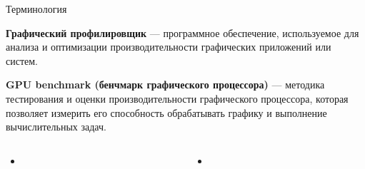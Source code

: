 \documentclass{beamer}
\begin{document}
\begin{frame}{Терминология}
{	\textbf{Графический профилировщик} --- программное обеспечение, используемое для анализа и оптимизации производительности графических приложений или систем. 
	
	\textbf{GPU benchmark (бенчмарк графического процессора)} --- методика тестирования и оценки производительности графического процессора, которая позволяет измерить его способность обрабатывать графику и выполнение вычислительных задач. 
}
\end{frame}

\begin{columns}
	
	\begin{column}{0.5\textwidth}
		\begin{itemize}
			\item
			
		\end{itemize}
	\end{column}
	\begin{column}{0.5\textwidth}
		\begin{itemize}
			\item
		\end{itemize}
	\end{column}
	
\end{columns}
\fi
	
\end{document}

